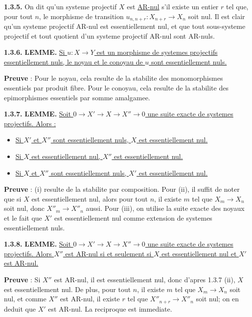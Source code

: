 \medskip
\noindent\textbf{1.3.5.} On dit qu'un systeme projectif $X$ est \underline{AR-nul} s'il existe un entier $r$ tel que, pour tout $n$, le morphisme de transition $u_{n,n+r} : X_{n+r} \longrightarrow X_n$ soit nul. Il est clair qu'un systeme projectif AR-nul est essentiellement nul, et que tout sous-systeme projectif et tout quotient d'un systeme projectif AR-nul sont AR-nuls.

\medskip
\noindent\textbf{1.3.6.} \textbf{LEMME.} \underline{Si $u : X \longrightarrow Y$ est un morphisme de systemes projectifs essentiellement nuls, le noyau et le conoyau de $u$ sont essentiellement nuls.}

\textbf{Preuve} : Pour le noyau, cela resulte de la stabilite des monomorphismes essentiels par produit fibre. Pour le conoyau, cela resulte de la stabilite des epimorphismes essentiels par somme amalgamee.

\medskip
\noindent\textbf{1.3.7.} \textbf{LEMME.} \underline{Soit $0 \longrightarrow X' \longrightarrow X \longrightarrow X'' \longrightarrow 0$ une suite exacte de systemes projectifs. Alors :}
\begin{itemize}
\item[(i)] \underline{Si $X'$ et $X''$ sont essentiellement nuls, $X$ est essentiellement nul.}
\item[(ii)] \underline{Si $X$ est essentiellement nul, $X''$ est essentiellement nul.}
\item[(iii)] \underline{Si $X$ et $X''$ sont essentiellement nuls, $X'$ est essentiellement nul.}
\end{itemize}

\textbf{Preuve} : (i) resulte de la stabilite par composition. Pour (ii), il suffit de noter que si $X$ est essentiellement nul, alors pour tout $n$, il existe $m$ tel que $X_m \longrightarrow X_n$ soit nul, donc $X''_m \longrightarrow X''_n$ aussi. Pour (iii), on utilise la suite exacte des noyaux et le fait que $X'$ est essentiellement nul comme extension de systemes essentiellement nuls.

\medskip
\noindent\textbf{1.3.8.} \textbf{LEMME.} \underline{Soit $0 \longrightarrow X' \longrightarrow X \longrightarrow X'' \longrightarrow 0$ une suite exacte de systemes projectifs. Alors $X''$ est AR-nul si et seulement si $X$ est essentiellement nul et $X'$ est AR-nul.}

\textbf{Preuve} : Si $X''$ est AR-nul, il est essentiellement nul, donc d'apres 1.3.7 (ii), $X$ est essentiellement nul. De plus, pour tout $n$, il existe $m$ tel que $X_m \longrightarrow X_n$ soit nul, et comme $X''$ est AR-nul, il existe $r$ tel que $X''_{n+r} \longrightarrow X''_n$ soit nul; on en deduit que $X'$ est AR-nul. La reciproque est immediate.

